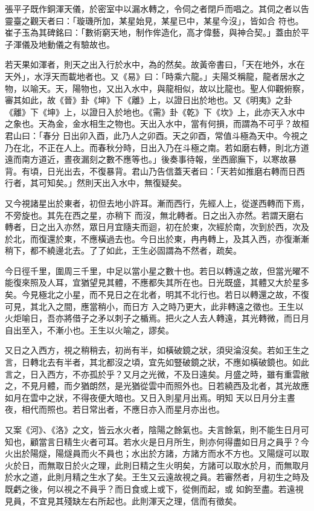 \begin{pinyinscope}
{{ 張平子既作銅渾天儀，於密室中以漏水轉之，令伺之者閉戶而唱之。其伺之者以告靈臺之觀天者曰：「璇璣所加，某星始見，某星已中，某星今沒」，皆如合
 符也。崔子玉為其碑銘曰：「數術窮天地，制作侔造化，高才偉藝，與神合契。」蓋由於平子渾儀及地動儀之有驗故也。



 若天果如渾者，則天之出入行於水中，為的然矣。故黃帝書曰，「天在地外，水在天外」，水浮天而載地者也。又《易》曰：「時乘六龍。」夫陽爻稱龍，龍者居水之物，以喻天。天，陽物也，又出入水中，與龍相似，故以比龍也。聖人仰觀俯察，審其如此，故《晉》卦《坤》下《離》上，以證日出於地也。又《明夷》之卦《離》下《坤》上，以證日入於地也。《需》卦《乾》下《坎》上，此亦天入水中之象也。天為金，金水相生之物也。天出入水中，當有何損，而謂為不可乎？故桓君山曰：「春分
 日出卯入酉，此乃人之卯酉。天之卯酉，常值斗極為天中。今視之乃在北，不正在人上。而春秋分時，日出入乃在斗極之南。若如磨右轉，則北方道遠而南方道近，晝夜漏刻之數不應等也。」後奏事待報，坐西廊廡下，以寒故暴背。有頃，日光出去，不復暴背。君山乃告信蓋天者曰：「天若如推磨右轉而日西行者，其可知矣。」然則天出入水中，無復疑矣。



 又今視諸星出於東者，初但去地小許耳。漸而西行，先經人上，從遂西轉而下焉，不旁旋也。其先在西之星，亦稍下
 而沒，無北轉者。日之出入亦然。若謂天磨右轉者，日之出入亦然，眾日月宜隨夫而迴，初在於東，次經於南，次到於西，次及於北，而復還於東，不應橫過去也。今日出於東，冉冉轉上，及其入西，亦復漸漸稍下，都不繞邊北去。了了如此，王生必固謂為不然者，疏矣。



 今日徑千里，圍周三千里，中足以當小星之數十也。若日以轉遠之故，但當光曜不能復來照及人耳，宜猶望見其體，不應都失其所在也。日光既盛，其體又大於星多矣。今見極北之小星，而不見日之在北者，明其不北行也。若日以轉還之故，不復可見，其北入之間，應當稍小，而日方
 入之時乃更大，此非轉遠之徵也。王生以火炬喻日，吾亦將借子之矛以刺子之楯焉。把火之人去人轉遠，其光轉微，而日月自出至入，不漸小也。王生以火喻之，謬矣。



 又日之入西方，視之稍稍去，初尚有半，如橫破鏡之狀，須臾淪沒矣。若如王生之言，日轉北去有半者，其北都沒之頃，宜先如豎破鏡之狀，不應如橫破鏡也。如此言之，日入西方，不亦孤於乎？又月之光微，不及日遠矣。月盛之時，雖有重雲敝之，不見月體，而夕猶朗然，是光猶從雲中而照外也。日若繞西及北者，其光故應如月在雲中之狀，不得夜便大暗也。又日入則星月出焉。明知
 天以日月分主晝夜，相代而照也。若日常出者，不應日亦入而星月亦出也。



 又案《河》、《洛》之文，皆云水火者，陰陽之餘氣也。夫言餘氣，則不能生日月可知也，顧當言日精生火者可耳。若水火是日月所生，則亦何得盡如日月之員乎？今火出於陽燧，陽燧員而火不員也；水出於方諸，方諸方而水不方也。又陽燧可以取火於日，而無取日於火之理，此則日精之生火明矣，方諸可以取水於月，而無取月於水之道，此則月精之生水了矣。王生又云遠故視之員。若審然者，月初生之時及既虧之後，何以視之不員乎？而日食或上或下，從側而起，或
 如鉤至盡。若遠視見員，不宜見其殘缺左右所起也。此則渾天之理，信而有徵矣。



}}
\end{pinyinscope}
